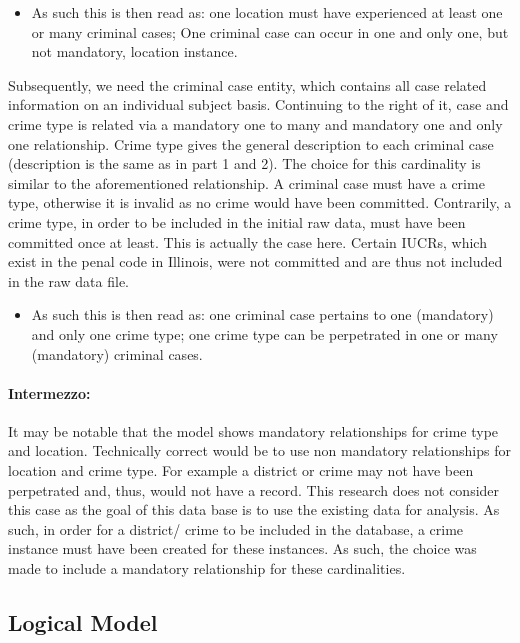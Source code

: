 \documentclass[a4paper]{article}
\begin{document}
\begin{itemize}
\item As such this is then read as: one location must have experienced at least one or many criminal cases; One criminal case can occur in one and only one, but not mandatory, location instance.
\end{itemize}

\indent Subsequently, we need the criminal case entity, which contains all case related information on an individual subject basis. Continuing to the right of it, case and crime type is related via a mandatory one to many and mandatory one and only one relationship. Crime type gives the general description to each criminal case (description is the same as in part 1 and 2). The choice for this cardinality is similar to the aforementioned relationship. A criminal case must have a crime type, otherwise it is invalid as no crime would have been committed. Contrarily, a crime type, in order to be included in the initial raw data, must have been committed once at least. This is actually the case here. Certain IUCRs, which exist in the penal code in Illinois, were not committed and are thus not included in the raw data file.
\begin{itemize}
\item As such this is then read as: one criminal case pertains to one (mandatory) and only one crime type; one crime type can be perpetrated in one or many (mandatory) criminal cases.
\end{itemize}

\paragraph{Intermezzo:} It may be notable that the model shows mandatory relationships for crime type and location. Technically correct would be to use non mandatory relationships for location and crime type. For example a district or crime may not have been perpetrated and, thus, would not have a record. This research does not consider this case as the goal of this data base is to use the existing data for analysis. As such, in order for a district/ crime to be included in the database, a crime instance must have been created for these instances. As such, the choice was made to include a mandatory relationship for these cardinalities.

\subsection{Logical Model}
\end{document}
